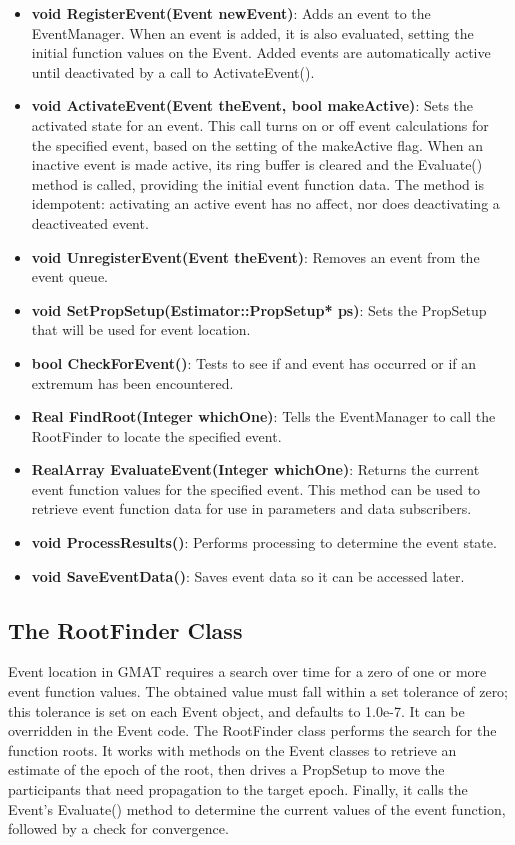 \begin{itemize}
\item \textbf{void RegisterEvent(Event newEvent)}:  Adds an event to the EventManager.  When an event is added, it is also evaluated, setting the initial function values on the Event.  Added events are automatically active until deactivated by a call to ActivateEvent().
\item \textbf{void ActivateEvent(Event theEvent, bool makeActive)}:  Sets the activated state for an event.  This call turns on or off event calculations for the specified event, based on the setting of the makeActive flag.  When an inactive event is made active, its ring buffer is cleared and the Evaluate() method is called, providing the initial event function data.  The method is idempotent: activating an active event has no affect, nor does deactivating a deactiveated event.
\item \textbf{void UnregisterEvent(Event theEvent)}:  Removes an event from the event queue.
\item \textbf{void SetPropSetup(Estimator::PropSetup* ps)}:  Sets the PropSetup that will be used for event location.
\item \textbf{bool CheckForEvent()}:  Tests to see if and event has occurred or if an extremum has been encountered.
\item \textbf{Real FindRoot(Integer whichOne)}:  Tells the EventManager to call the RootFinder to locate the specified event.
\item \textbf{RealArray EvaluateEvent(Integer whichOne)}:  Returns the current event function values for the specified event.  This method can be used to retrieve event function data for use in parameters and data subscribers.
\item \textbf{void ProcessResults()}:  Performs processing to determine the event state.
\item \textbf{void SaveEventData()}:  Saves event data so it can be accessed later.
\end{itemize}

\subsection{The RootFinder Class}

Event location in GMAT requires a search over time for a zero of one or more event function values.  The obtained value must fall within a set tolerance of zero; this tolerance is set on each Event object, and defaults to 1.0e-7.  It can be overridden in the Event code.  The RootFinder class performs the search for the function roots.  It works with methods on the Event classes to
retrieve an estimate of the epoch of the root, then drives a PropSetup to move the participants that need propagation to the target epoch.  Finally, it calls the Event's Evaluate() method to determine the current values of the event function, followed by a check for convergence.

